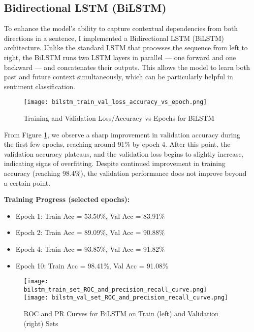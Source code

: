 \documentclass[12pt]{article}
\begin{document}
\subsection{Bidirectional LSTM (BiLSTM)}

To enhance the model's ability to capture contextual dependencies from both directions in a sentence, I implemented a Bidirectional LSTM (BiLSTM) architecture. Unlike the standard LSTM that processes the sequence from left to right, the BiLSTM runs two LSTM layers in parallel — one forward and one backward — and concatenates their outputs. This allows the model to learn both past and future context simultaneously, which can be particularly helpful in sentiment classification.

\begin{figure}[H]
    \centering
    \texttt{[image: bilstm\_train\_val\_loss\_accuracy\_vs\_epoch.png]}
    \caption{Training and Validation Loss/Accuracy vs Epochs for BiLSTM}
    \label{fig:bilstm_loss_acc}
\end{figure}

From Figure \ref{fig:bilstm_loss_acc}, we observe a sharp improvement in validation accuracy during the first few epochs, reaching around 91\% by epoch 4. After this point, the validation accuracy plateaus, and the validation loss begins to slightly increase, indicating signs of overfitting. Despite continued improvement in training accuracy (reaching 98.4\%), the validation performance does not improve beyond a certain point.

\vspace{1em}
\noindent
\textbf{Training Progress (selected epochs):}
\begin{itemize}
    \item Epoch 1: Train Acc = 53.50\%, Val Acc = 83.91\%
    \item Epoch 2: Train Acc = 89.09\%, Val Acc = 90.88\%
    \item Epoch 4: Train Acc = 93.85\%, Val Acc = 91.82\%
    \item Epoch 10: Train Acc = 98.41\%, Val Acc = 91.08\%
\end{itemize}

\begin{figure}[H]
    \centering
    \texttt{[image: bilstm\_train\_set\_ROC\_and\_precision\_recall\_curve.png]}
    \texttt{[image: bilstm\_val\_set\_ROC\_and\_precision\_recall\_curve.png]}
    \caption{ROC and PR Curves for BiLSTM on Train (left) and Validation (right) Sets}
    \label{fig:bilstm_roc_pr_train_val}
\end{figure}
\end{document}
